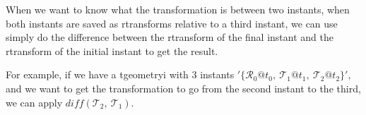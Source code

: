 When we want to know what the transformation is between two instants, when both instants are saved as rtransforms relative to a third instant, we can use simply do the difference between the rtransform of the final instant and the rtransform of the initial instant to get the result.

For example, if we have a tgeometryi with 3 instants $'\{\mathcal{R}_0@t_0,\ \mathcal{T}_1@t_1,\ \mathcal{T}_2@t_2\}'$, and we want to get the transformation to go from the second instant to the third, we can apply $\textit{diff}(\mathcal{T}_2,\ \mathcal{T}_1)$.